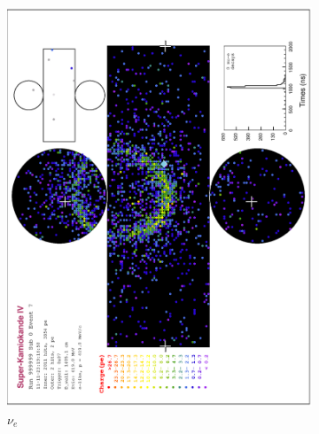 \begin{figure}
    \centering
    \begin{subfigure}[b]{\dbfigwid\textwidth}
        \centering
        \includegraphics[width=\textwidth]{figures/t2k/sk-nue.eps}
        \caption{\(\nu_e\)}
        \label{subfig:sk-nue}
    \end{subfigure}
    \begin{subfigure}[b]{\dbfigwid\textwidth}
        \centering

\end{subfigure}
\end{figure}
